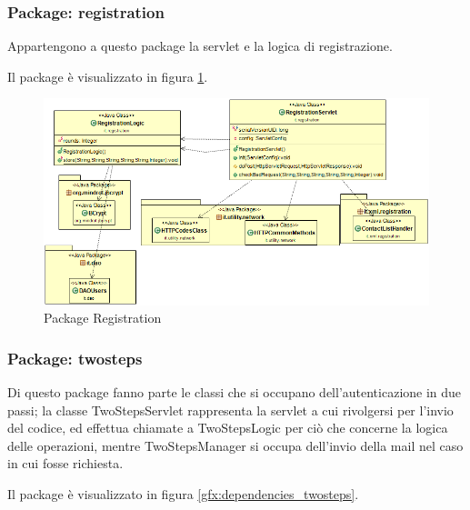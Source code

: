 \subsubsection{Package: \textbf{registration}}

Appartengono a questo package la servlet e la logica di registrazione.


Il package è visualizzato in figura \ref{gfx:registration}.

\begin{figure}[!htbp]
	\centering
	\includegraphics[scale = .5]{img/dependencies_registration.png}
	\caption{Package Registration}
	\label{gfx:registration}
\end{figure}


\subsubsection{Package: \textbf{twosteps}}

Di questo package fanno parte le classi che si occupano dell’autenticazione in due passi; la classe TwoStepsServlet rappresenta la servlet a cui rivolgersi per l’invio del codice, ed effettua chiamate a TwoStepsLogic per ciò che concerne la logica delle operazioni, mentre TwoStepsManager si occupa dell’invio della mail nel caso in cui fosse richiesta.

Il package è visualizzato in figura \ref{gfx:dependencies_twosteps}.

